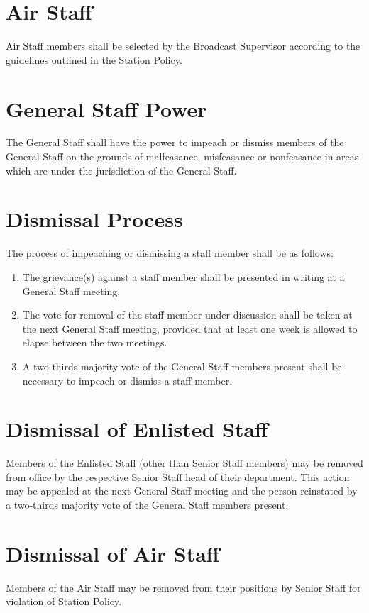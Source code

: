 \documentclass[12pt]{constitution}
\begin{document}
\section{Air Staff}
​Air Staff members shall be selected by the Broadcast Supervisor according to the guidelines outlined in the Station Policy.




\section{​General Staff Power}
The General Staff shall have the power to impeach or dismiss members of the General Staff on the grounds of malfeasance, misfeasance or nonfeasance in areas which are under the jurisdiction of the General Staff.


\section{​Dismissal Process}
The process of impeaching or dismissing a staff member shall be as follows:
\begin{enumerate}
\item The grievance(s) against a staff member shall be presented in writing at a General Staff meeting.
\item The vote for removal of the staff member under discussion shall be taken at the next General Staff meeting, provided that at least one week is allowed to elapse between the two meetings.
\item A two-­thirds majority vote of the General Staff members present shall be necessary to impeach or dismiss a staff member.
\end{enumerate}


\section{​Dismissal of Enlisted Staff}
Members of the Enlisted Staff (other than Senior Staff members) may be removed from office by the respective Senior Staff head of their department. This action may be appealed at the next General Staff meeting and the person reinstated by a two-­thirds majority vote of the General Staff members present.


\section{​Dismissal of Air Staff}
Members of the Air Staff may be removed from their positions by Senior Staff for violation of Station Policy.
\end{document}

